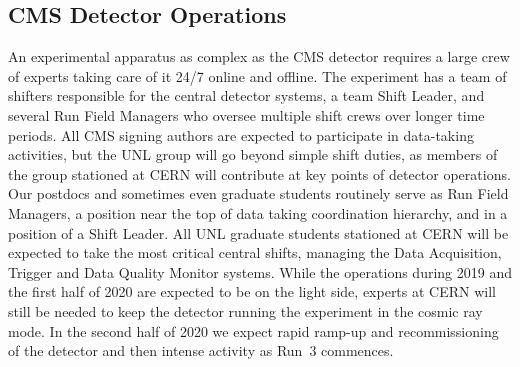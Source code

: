 \subsection{CMS Detector Operations}
An experimental apparatus as complex as the CMS detector requires a large crew of experts taking care of it 24/7 online and offline. The experiment has a team of shifters responsible for the central detector systems, a team Shift Leader, and several Run Field Managers who oversee multiple shift crews over longer time periods. 
All CMS signing authors are expected to participate in data-taking activities, but the UNL group will go beyond simple shift duties, as members of the group stationed at CERN will contribute at key points of detector operations.  Our postdocs and sometimes even graduate students routinely serve as Run Field Managers, a position near the top of data taking coordination hierarchy, and in a position of a Shift Leader.
All UNL graduate students stationed at CERN will be expected to take the most critical central shifts, managing the Data Acquisition, Trigger and Data Quality Monitor systems. While the operations during 2019 and the first half of 2020 are expected to be on the light side, experts at CERN will still be needed to keep the detector running the experiment in the cosmic ray mode. In the second half of 2020 we expect rapid ramp-up and recommissioning of the detector and then intense activity as Run~3 commences. 
